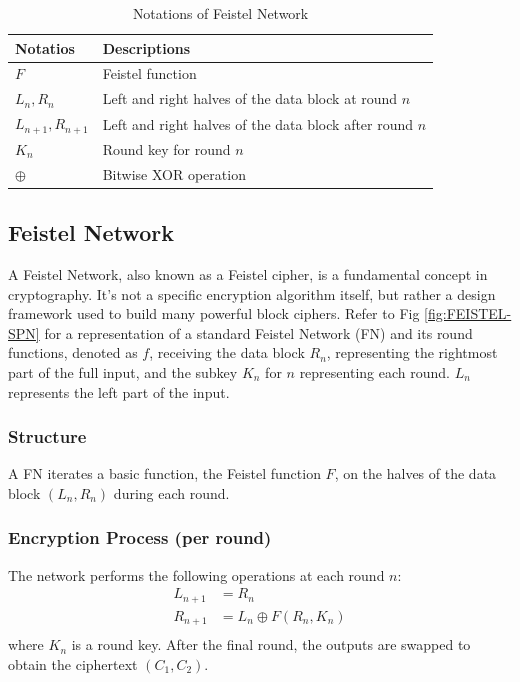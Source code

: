 \documentclass[conference]{IEEEtran}
\begin{document}
\begin{table}[ht]
    \centering
    \caption{Notations of Feistel Network}
    \begin{tabular}{ll}
        \toprule
        \textbf{Notatios} & \textbf{Descriptions} \\
        \midrule
        $F$ & Feistel function \\
        $L_n, R_n$ & Left and right halves of the data block at round $n$ \\
        $L_{n+1}, R_{n+1}$ & Left and right halves of the data block after round $n$ \\
        $K_n$ & Round key for round $n$ \\
        $\oplus$ & Bitwise XOR operation \\
        \bottomrule
    \end{tabular}
    \label{table:fn}
\end{table}

\subsection{Feistel Network}
A Feistel Network, also known as a Feistel cipher, is a fundamental concept in cryptography. It's not a specific encryption algorithm itself, but rather a design framework used to build many powerful block ciphers. Refer to Fig \ref{fig:FEISTEL-SPN} for a representation of a standard Feistel Network (FN) and its round functions, denoted as $f$, receiving the data block $R_n$, representing the rightmost part of the full input, and the subkey $K_n$ for $n$ representing each round. $L_n$ represents the left part of the input.
\subsubsection{Structure}
A FN iterates a basic function, the Feistel function $F$, on the halves of the data block $(L_n, R_n)$ during each round.
\subsubsection{Encryption Process (per round)}
The network performs the following operations at each round $n$:
\begin{align*}
    L_{n+1} &= R_n \\
    R_{n+1} &= L_n \oplus F(R_n, K_n) \\
\end{align*}
where $K_n$ is a round key. After the final round, the outputs are swapped to obtain the ciphertext $(C_1, C_2)$.
\end{document}
